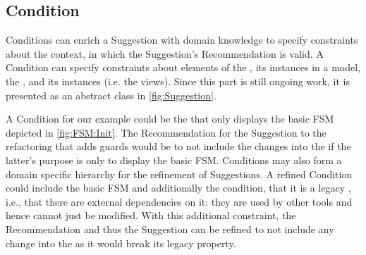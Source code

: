 \subsection{Condition}
\label{sec:Conditions}
\textsf{Condition}s can enrich a \textsf{Suggestion} with domain knowledge to 
specify constraints about the context, in which the \textsf{Suggestion}'s 
\textsf{Recommendation} is valid. A \textsf{Condition} can specify constraints 
about elements of the \metamodel, its instances in a model, the \viewtype 
\metamodel, and its instances (i.e. the views). 
Since this part is still ongoing work, it is presented as an abstract class 
in \cref{fig:Suggestion}.

A \textsf{Condition} for our example could be the \viewtype that 
only displays the basic \textsf{FSM} depicted in \cref{fig:FSM:Init}. 
The \textsf{Recommendation} for the \textsf{Suggestion} to the refactoring that 
adds guards would be to not include the \metamodel changes into the \viewtype if the latter's purpose is only to display the basic \textsf{FSM}.
\textsf{Conditions} may also form a 
domain specific hierarchy for the refinement of \textsf{Suggestion}s. A refined 
\textsf{Condition} could include the basic \textsf{FSM} \viewtype and additionally
the condition, that it is a legacy \viewtype, i.e., that there are external dependencies on it: %
they are used by other tools and hence cannot just be modified. With this additional constraint, the 
\textsf{Recommendation} and thus the \textsf{Suggestion} can be refined to not 
include any \metamodel change into the \viewtype as it would break its legacy 
property.